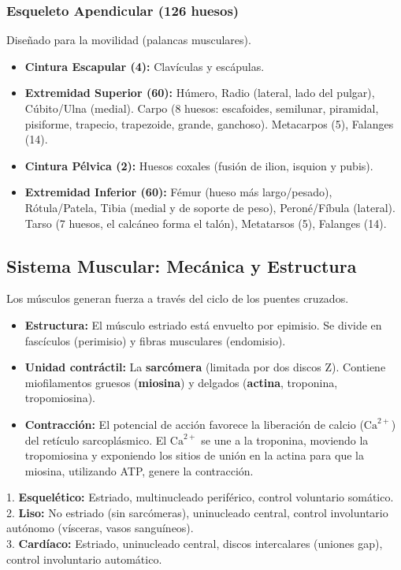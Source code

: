 \subsubsection{Esqueleto Apendicular (126 huesos)}
Diseñado para la movilidad (palancas musculares).
\begin{itemize}
    \item \textbf{Cintura Escapular (4):} Clavículas y escápulas.
    \item \textbf{Extremidad Superior (60):} Húmero, Radio (lateral, lado del pulgar), Cúbito/Ulna (medial). Carpo (8 huesos: escafoides, semilunar, piramidal, pisiforme, trapecio, trapezoide, grande, ganchoso). Metacarpos (5), Falanges (14).
    \item \textbf{Cintura Pélvica (2):} Huesos coxales (fusión de ilion, isquion y pubis).
    \item \textbf{Extremidad Inferior (60):} Fémur (hueso más largo/pesado), Rótula/Patela, Tibia (medial y de soporte de peso), Peroné/Fíbula (lateral). Tarso (7 huesos, el calcáneo forma el talón), Metatarsos (5), Falanges (14).
\end{itemize}

\subsection{Sistema Muscular: Mecánica y Estructura}
Los músculos generan fuerza a través del ciclo de los puentes cruzados.
\begin{itemize}
    \item \textbf{Estructura:} El músculo estriado está envuelto por epimisio. Se divide en fascículos (perimisio) y fibras musculares (endomisio). 
    \item \textbf{Unidad contráctil:} La \textbf{sarcómera} (limitada por dos discos Z). Contiene miofilamentos gruesos (\textbf{miosina}) y delgados (\textbf{actina}, troponina, tropomiosina).
    \item \textbf{Contracción:} El potencial de acción favorece la liberación de calcio ($\mathrm{Ca}^{2+}$) del retículo sarcoplásmico. El $\mathrm{Ca}^{2+}$ se une a la troponina, moviendo la tropomiosina y exponiendo los sitios de unión en la actina para que la miosina, utilizando ATP, genere la contracción.
\end{itemize}
\begin{tcolorbox}[colback=red!5!white,colframe=red!75!black,title=Clasificación del Tejido Muscular]
1. \textbf{Esquelético:} Estriado, multinucleado periférico, control voluntario somático.\\
2. \textbf{Liso:} No estriado (sin sarcómeras), uninucleado central, control involuntario autónomo (vísceras, vasos sanguíneos).\\
3. \textbf{Cardíaco:} Estriado, uninucleado central, discos intercalares (uniones gap), control involuntario automático.
\end{tcolorbox}


